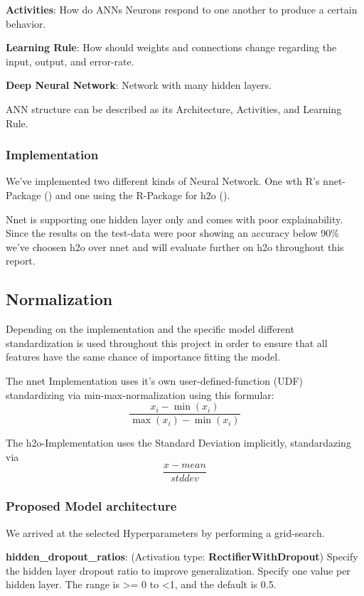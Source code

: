 \documentclass[]{article}
\begin{document}
\textbf{Activities}: How do ANNs Neurons respond to one another to
produce a certain behavior.

\textbf{Learning Rule}: How should weights and connections change
regarding the input, output, and error-rate.

\textbf{Deep Neural Network}: Network with many hidden layers.

ANN structure can be described as its Architecture, Activities, and
Learning Rule.

\subsubsection{Implementation}\label{implementation}

We've implemented two different kinds of Neural Network. One wth R's
nnet-Package (\cite{nnet}) and one using the R-Package for h2o
(\cite{h2o}).

Nnet is supporting one hidden layer only and comes with poor
explainability. Since the results on the test-data were poor showing an
accuracy below 90\% we've choosen h2o over nnet and will evaluate
further on h2o throughout this report.

\subsection{Normalization}\label{normalization}

Depending on the implementation and the specific model different
standardization is used throughout this project in order to ensure that
all features have the same chance of importance fitting the model.

The nnet Implementation uses it's own user-defined-function (UDF)
standardizing via min-max-normalization using this formular: \[
\frac{x_i-\min(x_i)}{\max(x_i)-\min(x_i)}
\]

The h2o-Implementation uses the Standard Deviation implicitly,
standardazing via \[
\frac{x-mean}{stddev}
\]

\subsubsection{Proposed Model
architecture}\label{proposed-model-architecture}

We arrived at the selected Hyperparameters by performing a grid-search.

\textbf{hidden\_dropout\_ratios}: (Activation type:
\textbf{RectifierWithDropout}) Specify the hidden layer dropout ratio to
improve generalization. Specify one value per hidden layer. The range is
\textgreater{}= 0 to \textless{}1, and the default is 0.5.
\end{document}
